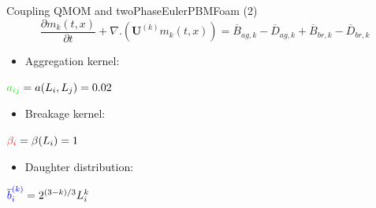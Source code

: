 \documentclass{beamer}
\begin{document}
\begin{frame}{Coupling QMOM and twoPhaseEulerPBMFoam (2)}
\begin{equation*}
\frac{\partial m_k (t,x)}{\partial t}+\nabla .(\textbf{U}^{(k)}m_k(t,x)) = \overline{B}_{ag,k}-\overline{D}_{ag,k} +\overline{B}_{br,k}-\overline{D}_{br,k}
\end{equation*}

\begin{itemize}
\item Aggregation kernel: 
\end{itemize}
\begin{center}
$\textcolor{green}{a_{ij}}=a(L_i,L_j)=0.02$ 
\end{center}

\begin{itemize}
\item Breakage kernel:
\end{itemize}
\begin{center}
$\textcolor{red}{\beta_{i}}=\beta(L_i)=1$ 
\end{center}

\begin{itemize}
\item Daughter distribution: 
\end{itemize}
\begin{center}
$\textcolor{blue}{\overline{b}^{(k)}_i}=2^{(3-k)/3}L_i^k$
\end{center} 

\begin{center}
\end{center}

\end{frame}
\end{document}
